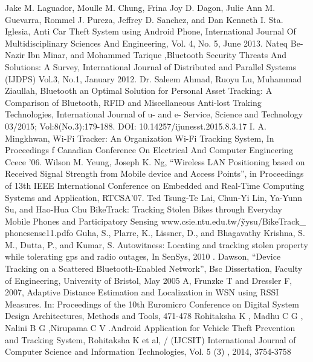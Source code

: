 \documentclass[a4paper,10pt]{report}
\begin{document}
\begin{thebibliography}{9}
 Jake M. Laguador, Moulle M. Chung, Frina Joy D. Dagon, Julie Ann M. Guevarra, Rommel J. Pureza, Jeffrey D. Sanchez, and Dan Kenneth I. Sta. Iglesia, Anti Car Theft System using Android Phone, International Journal Of Multidisciplinary Sciences And Engineering, Vol. 4, No. 5, June 2013.
 Nateq Be-Nazir Ibn Minar, and Mohammed Tarique ,Bluetooth Security Threats And Solutions: A Survey, International Journal of Distributed and Parallel Systems (IJDPS) Vol.3, No.1, January 2012.
 Dr. Saleem Ahmad, Ruoyu Lu, Muhammad Ziaullah, Bluetooth an Optimal Solution for Personal Asset Tracking: A Comparison of Bluetooth, RFID and Miscellaneous Anti-lost Traking Technologies, International Journal of u- and e- Service, Science and Technology 03/2015; Vol:8(No.3):179-188. DOI: 10.14257/ijunesst.2015.8.3.17
 I. A. Mingkhwan, Wi-Fi Tracker: An Organization Wi-Fi Tracking System, In Proceedings f Canadian Conference On Electrical And Computer Engineering Ccece '06.
 Wilson M. Yeung, Joseph K. Ng, “Wireless LAN Positioning based on Received Signal Strength from Mobile device and Access Points”, in Proceedings of 13th IEEE International Conference on Embedded and Real-Time Computing Systems and Application, RTCSA’07.
 Ted Tsung-Te Lai, Chun-Yi Lin, Ya-Yunn Su, and Hao-Hua Chu  BikeTrack: Tracking Stolen Bikes through Everyday Mobile Phones and Participatory Sensing www.csie.ntu.edu.tw/\~yysu/BikeTrack\_ phonesense11.pdfo
  Guha, S., Plarre, K., Lissner, D., and Bhagavathy Krishna, S. M., Dutta, P., and Kumar, S. Autowitness: Locating and tracking stolen property while tolerating gps and radio outages, In SenSys, 2010
 . Dawson, “Device Tracking on a Scattered Bluetooth-Enabled Network”, Bsc Dissertation, Faculty of Engineering, University of Bristol, May 2005
  A, Frunzke T and Dressler F, 2007, Adaptive Distance Estimation and Localization in WSN using RSSI Measures. In: Proceedings of the 10th Euromicro Conference on Digital System Design Architectures, Methods and Tools, 471-478
 Rohitaksha K , Madhu C G , Nalini B G ,Nirupama C V .Android Application for Vehicle Theft Prevention and Tracking System, Rohitaksha K et al, / (IJCSIT) International Journal of Computer Science and Information Technologies, Vol. 5 (3) , 2014, 3754-3758
\end{thebibliography}
\end{document}
